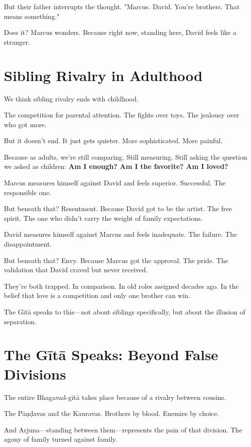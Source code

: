 \documentclass[11pt,twoside]{book}
\begin{document}
But their father interrupts the thought. "Marcus. David. You're brothers. That means something."

Does it? Marcus wonders. Because right now, standing here, David feels like a stranger.

\section*{Sibling Rivalry in Adulthood}

We think sibling rivalry ends with childhood.

The competition for parental attention. The fights over toys. The jealousy over who got more.

But it doesn't end. It just gets quieter. More sophisticated. More painful.

Because as adults, we're still comparing. Still measuring. Still asking the question we asked as children: \textbf{Am I enough? Am I the favorite? Am I loved?}

Marcus measures himself against David and feels superior. Successful. The responsible one.

But beneath that? Resentment. Because David got to be the artist. The free spirit. The one who didn't carry the weight of family expectations.

David measures himself against Marcus and feels inadequate. The failure. The disappointment.

But beneath that? Envy. Because Marcus got the approval. The pride. The validation that David craved but never received.

They're both trapped. In comparison. In old roles assigned decades ago. In the belief that love is a competition and only one brother can win.

The Gītā speaks to this—not about siblings specifically, but about the illusion of separation.

\section*{The Gītā Speaks: Beyond False Divisions}

The entire Bhagavad-gītā takes place because of a rivalry between cousins.

The Pāṇḍavas and the Kauravas. Brothers by blood. Enemies by choice.

And Arjuna—standing between them—represents the pain of that division. The agony of family turned against family.
\end{document}
